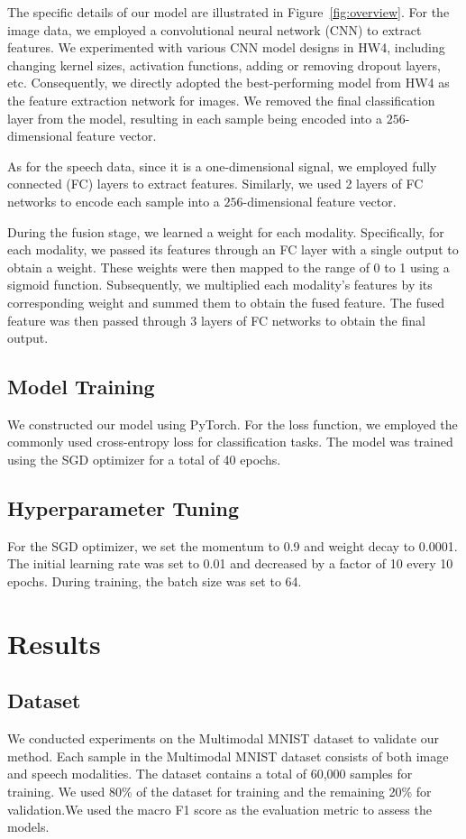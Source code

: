 \documentclass{article}
\begin{document}
The specific details of our model are illustrated in Figure~\ref{fig:overview}. For the image data, we employed a convolutional neural network (CNN) to extract features. We experimented with various CNN model designs in HW4, including changing kernel sizes, activation functions, adding or removing dropout layers, etc. Consequently, we directly adopted the best-performing model from HW4 as the feature extraction network for images. We removed the final classification layer from the model, resulting in each sample being encoded into a $256$-dimensional feature vector.

As for the speech data, since it is a one-dimensional signal, we employed fully connected (FC) layers to extract features. Similarly, we used 2 layers of FC networks to encode each sample into a $256$-dimensional feature vector.

During the fusion stage, we learned a weight for each modality. Specifically, for each modality, we passed its features through an FC layer with a single output to obtain a weight. These weights were then mapped to the range of 0 to 1 using a sigmoid function. Subsequently, we multiplied each modality's features by its corresponding weight and summed them to obtain the fused feature. The fused feature was then passed through 3 layers of FC networks to obtain the final output.
\subsection{Model Training}

We constructed our model using PyTorch. For the loss function, we employed the commonly used cross-entropy loss for classification tasks. The model was trained using the SGD optimizer for a total of 40 epochs.

\subsection{Hyperparameter Tuning}

For the SGD optimizer, we set the momentum to 0.9 and weight decay to 0.0001. The initial learning rate was set to 0.01 and decreased by a factor of 10 every 10 epochs. During training, the batch size was set to 64.

\section{Results}

\subsection{Dataset}
We conducted experiments on the Multimodal MNIST dataset to validate our method. Each sample in the Multimodal MNIST dataset consists of both image and speech modalities. The dataset contains a total of 60,000 samples for training. We used 80\% of the dataset for training and the remaining 20\% for validation.We used the macro F1 score as the evaluation metric to assess the models.
\end{document}
